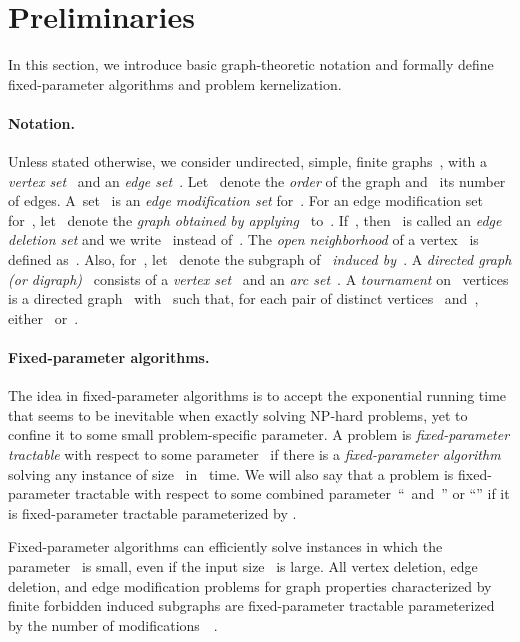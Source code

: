 \documentclass[envcountsame,numbook,smallextended]{svjour3}
\numberwithin{equation}{section}
\numberwithin{figure}{section}
\begin{document}
\section{Preliminaries}\label{sec:prelim}
In this section, we introduce basic graph-theoretic notation and formally define fixed-parameter algorithms and problem kernelization.
\paragraph{Notation.}
\label{sec:notation}
Unless stated otherwise, we consider undirected, simple, finite graphs~, with a \emph{vertex set}~ and an \emph{edge set}~.  Let~ denote the \emph{order} of the graph and~ its number of edges.  A~set~ is an \emph{edge modification set} for~. For an edge modification set~ for~, let~ denote the \emph{graph obtained by applying}~ to~.  If~, then~ is called an \emph{edge deletion set} and we write~ instead of~.  
The \emph{open neighborhood} of a vertex~ is defined as~. Also, for~, let~ denote the subgraph of~ \emph{induced by~}.
A \emph{directed graph (or digraph)}~ consists of a \emph{vertex set}~ and an \emph{arc set}~.  A \emph{tournament} on~ vertices is a directed graph~ with~ such that, for each pair of distinct vertices~ and~, either~ or~.




\paragraph{Fixed-parameter algorithms.} The idea in fixed-parameter algorithms is to accept the exponential running time that seems to be inevitable when exactly solving NP-hard problems, yet to confine it to some small problem-specific parameter.  A problem is \emph{fixed-parameter tractable} with respect to some parameter~ if there is a \emph{fixed-parameter algorithm} solving any instance of size~ in ~time.  We will also say that a problem is fixed-parameter tractable with respect to some combined parameter~``~and~'' or ``'' if it is fixed-parameter tractable parameterized by .

Fixed-parameter algorithms can efficiently solve instances in which the parameter~ is small, even if the input size~ is large.  All  vertex deletion, edge deletion, and edge modification problems for graph properties characterized by finite forbidden induced subgraphs are fixed-parameter tractable parameterized by the number of modifications~~\cite{Cai96}.
\end{document}

